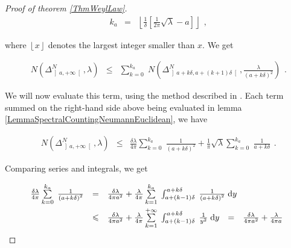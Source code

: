 \documentclass{jams-l}
\theoremstyle{definition}
\theoremstyle{remark}
\numberwithin{equation}{section}
\begin{document}
\begin{proof}[Proof of theorem \ref{ThmWeylLaw}]
            \[ \begin{array}{lll}
                    k_a & = & \left \lfloor \frac{1}{\delta} \left[ \frac{1}{2\pi} \sqrt{\lambda} - a \right] \right \rfloor
                \end{array} , \]
            
            \noindent where $\left \lfloor x \right \rfloor$ denotes the largest integer smaller than $x$. We get
            
            \[ \begin{array}{lll}
                    N \left( \Delta^N_{\left] a, + \infty \right[}, \lambda \right) & \leqslant & \sum\limits_{k=0}^{k_a} \; N \left( \Delta^N_{\left] a+k \delta, a+\left( k+1 \right) \delta \right[}, \frac{\lambda}{\left( a + k \delta \right)^2} \right)
                \end{array} . \]
            
            \noindent We will now evaluate this term, using the method described in \cite[Thm 6]{MR699488}. Each term summed on the right-hand side above being evaluated in lemma \ref{LemmaSpectralCountingNeumannEuclidean}, we have
            
            \[ \begin{array}{lll}
                    N \left( \Delta^N_{\left] a, + \infty \right[}, \lambda \right) & \leqslant & \frac{\delta \lambda}{4 \pi} \sum\limits_{k=0}^{k_a} \; \frac{1}{\left( a + k \delta \right)^2} + \frac{1}{\pi} \sqrt{\lambda} \sum\limits_{k=0}^{k_a} \; \frac{1}{a + k \delta}
                \end{array} . \]
            
            \noindent Comparing series and integrals, we get
            
            \[ \begin{array}{lllll}
                    \frac{\delta \lambda}{4 \pi} \sum\limits_{k=0}^{k_a} \; \frac{1}{\left( a + k \delta \right)^2} & = & \multicolumn{3}{l}{\frac{\delta \lambda}{4 \pi a^2} + \frac{\lambda}{4 \pi} \sum\limits_{k=1}^{k_a} \; \int_{a+\left( k - 1 \right) \delta}^{a + k \delta} \; \frac{1}{\left( a + k \delta \right)^2} \; \mathrm{d}y} \\[1em]
                    
                    & \leqslant & \frac{\delta \lambda}{4 \pi a^2} + \frac{\lambda}{4 \pi} \sum\limits_{k=1}^{+ \infty} \; \int_{a+\left( k - 1 \right) \delta}^{a + k \delta} \; \frac{1}{y^2} \; \mathrm{d}y & = & \frac{\delta \lambda}{4 \pi a^2} + \frac{\lambda}{4 \pi a}
                \end{array} \]
            

\end{proof}
\end{document}
